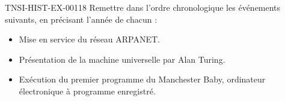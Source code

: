 \begin{exercice}{TNSI-HIST-EX-001}{1}{8}
Remettre dans l'ordre chronologique les événements suivants, en précisant
l'année de chacun :
\begin{itemize}
  \item Mise en service du réseau ARPANET.
  \item Présentation de la machine universelle par Alan Turing.
  \item Exécution du premier programme du Manchester Baby, ordinateur
    électronique à programme enregistré.
\end{itemize}
\end{exercice}
